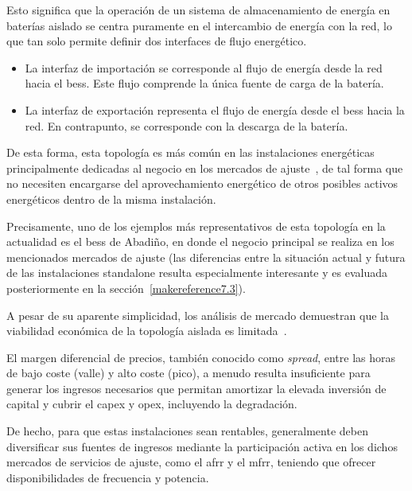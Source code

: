Esto significa que la operación de un sistema de almacenamiento de energía en baterías aislado se centra puramente en el intercambio de energía con la red, lo que tan solo permite definir dos interfaces de flujo energético.

\begin{itemize}

  \item La interfaz de importación se corresponde al flujo de energía desde la red hacia el \gls{bess}. Este flujo comprende la única fuente de carga de la batería.

  \item  La interfaz de exportación representa el flujo de energía desde el \gls{bess} hacia la red. En contrapunto, se corresponde con la descarga de la batería.

\end{itemize}

De esta forma, esta topología es más común en las instalaciones energéticas principalmente dedicadas al negocio en los mercados de ajuste~\cite{carbajo2007mercados}, de tal forma que no necesiten encargarse del aprovechamiento energético de otros posibles activos energéticos dentro de la misma instalación.

Precisamente, uno de los ejemplos más representativos de esta topología en la actualidad es el \gls{bess} de Abadiño, en donde el negocio principal se realiza en los mencionados mercados de ajuste (las diferencias entre la situación actual y futura de las instalaciones standalone resulta especialmente interesante y es evaluada posteriormente en la sección~\ref{makereference7.3}).

A pesar de su aparente simplicidad, los análisis de mercado demuestran que la viabilidad económica de la topología aislada es limitada~\cite{azahra2020optimized, baviskar2023opportunities, kalenderova2024batery}.

El margen diferencial de precios, también conocido como \textit{spread}, entre las horas de bajo coste (valle) y alto coste (pico), a menudo resulta insuficiente para generar los ingresos necesarios que permitan amortizar la elevada inversión de capital y cubrir el \gls{capex} y \gls{opex}, incluyendo la degradación.

De hecho, para que estas instalaciones sean rentables, generalmente deben diversificar sus fuentes de ingresos mediante la participación activa en los dichos mercados de servicios de ajuste, como el \gls{afrr} y el \gls{mfrr}, teniendo que ofrecer disponibilidades de frecuencia y potencia.

